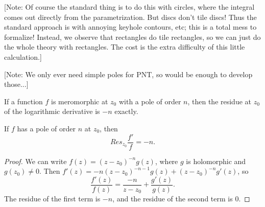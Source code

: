 [Note: Of course the standard thing is to do this with circles, where the integral comes out directly from the parametrization. But discs don't tile
discs! Thus the standard approach is with annoying keyhole contours, etc; this is a total mess to formalize! Instead, we observe that rectangles do tile rectangles, so we can just do the
whole theory with rectangles. The cost is the extra difficulty of this little calculation.]

[Note: We only ever need simple poles for PNT, so would be enough to develop those...]



If a function $f$ is meromorphic at $z_0$ with a pole of order $n$, then
the residue at $z_0$ of the logarithmic derivative is $-n$ exactly.
\begin{theorem}\label{ResidueOfLogDerivative}
If $f$ has a pole of order $n$ at $z_0$, then
$$
Res_{z_0} \frac{f'}f = -n.
$$
\end{theorem}



\begin{proof}
We can write $f(z) = (z-z_0)^{-n} g(z)$, where $g$ is holomorphic and $g(z_0) \neq 0$.
Then $f'(z) = -n(z-z_0)^{-n-1} g(z) + (z-z_0)^{-n} g'(z)$, so
$$
\frac{f'(z)}{f(z)} = \frac{-n}{z-z_0} + \frac{g'(z)}{g(z)}.
$$
The residue of the first term is $-n$, and the residue of the second term is $0$.
\end{proof}


